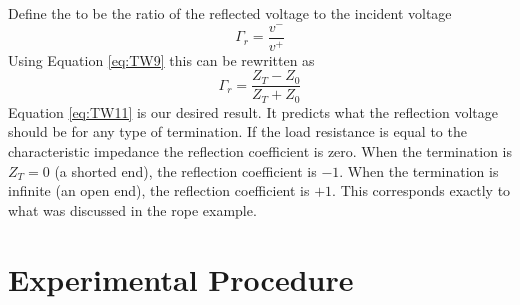 \noindent Define the  to be the ratio of the reflected voltage
to the incident voltage \begin{equation}\label{eq:TW10}
    \Gamma_r = \frac{v^-}{v^+}
\end{equation}
Using Equation \ref{eq:TW9} this can be rewritten as \begin{equation}\label{eq:TW11}
    \Gamma_r = \frac{Z_T-Z_0}{Z_T+Z_0}
\end{equation}
Equation \ref{eq:TW11} is our desired result.  It predicts what the reflection voltage should be for any type of termination. If the load resistance is equal to the characteristic impedance the reflection coefficient is zero. When the termination is $Z_T = 0$ (a shorted end), the reflection coefficient is $-1$. When the termination is infinite (an open end), the reflection coefficient is $+1$. This corresponds exactly to what was discussed in the rope example.

\section{Experimental Procedure}

